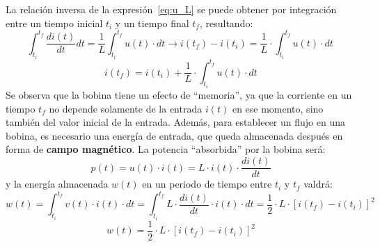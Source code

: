 	La relación inversa de la expresión~\eqref{eq:u_L} se puede
        obtener por integración entre un tiempo inicial $t_i$ y un
        tiempo final $t_f$, resultando:
	\begin{equation*}
          \int_{t_i}^{t_f} \dfrac{di(t)}{dt}dt=\dfrac{1}{L}\int_{t_i}^{t_f}u(t)\cdot dt \rightarrow i(t_f)-i(t_i)=\dfrac{1}{L}\cdot\int_{t_i}^{t_f} u(t)\cdot dt\,
	\end{equation*}
	\begin{equation}
          \boxed{i(t_f)=i(t_i)+\dfrac{1}{L}\cdot\int_{t_i}^{t_f} u(t)\cdot dt}
	\end{equation}
	Se observa que la bobina tiene un efecto de ``memoria'', ya
        que la corriente en un tiempo $t_f$ no depende solamente de la
        entrada $i(t)$ en ese momento, sino también del valor inicial
        de la entrada. Además, para establecer un flujo en una bobina,
        es necesario una energía de entrada, que queda almacenada
        después en forma de \textbf{campo magnético}. La potencia
        ``absorbida'' por la bobina será:
	\begin{equation*}
          p(t)=u(t)\cdot i(t)=L\cdot i(t)\cdot\dfrac{di(t)}{dt}
	\end{equation*}
	y la energía almacenada $w(t)$ en un periodo de tiempo entre
        $t_i$ y $t_f$ valdrá:
	\begin{equation*}
          w(t)=\int_{t_i}^{t_f}v(t)\cdot i(t)\cdot dt=\int_{t_i}^{t_f}L\cdot\dfrac{di(t)}{dt}\cdot i(t)\cdot dt=\dfrac{1}{2}\cdot L\cdot [i(t_f)-i(t_i)]^2
	\end{equation*}
	\begin{equation}
          \boxed{w(t)=\dfrac{1}{2}\cdot L\cdot [i(t_f)-i(t_i)]^2}
	\end{equation}
	
